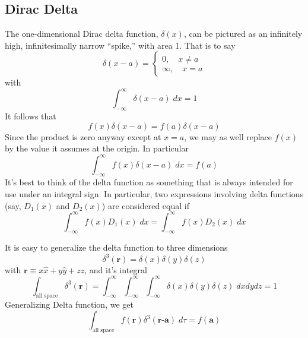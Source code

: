 \documentclass[../../../main.tex]{subfiles}
\begin{document}
\subsection{Dirac Delta}
The one-dimensional Dirac delta function, $\delta(x)$, can be pictured as an infinitely high, infinitesimally narrow “spike,” with area 1. That is to say
\begin{equation*}
    \delta (x-a)=\begin{cases}
        0,\quad  x\neq a \\
        \infty,\quad  x=a
    \end{cases}
\end{equation*}
with
\begin{equation*}
    \int_{-\infty}^{\infty} \delta (x-a)\;dx =1
\end{equation*}
It follows that
\begin{equation*}
    f(x)\delta(x-a)=f(a)\delta(x-a)
\end{equation*}
Since the product is zero anyway except at $x = a$, we may as well replace $f (x)$ by the value it assumes at the origin. In particular
\begin{equation*}
    \int_{-\infty}^{\infty}f(x)\delta(x-a)\;dx=f(a)
\end{equation*}
It's best to think of the delta function as something that is always intended for use under an integral sign. In particular, two expressions involving delta functions (say, $D_1(x)$ and $D_2(x)$) are considered equal if
\begin{equation*}
    \int_{-\infty}^{\infty}f(x)D_1(x)\;dx=\int_{-\infty}^{\infty}f(x)D_2(x)\;dx
\end{equation*}

It is easy to generalize the delta function to three dimensions
\begin{equation*}
    \delta^3(\textbf{r})=\delta (x)\delta (y)\delta(z)
\end{equation*}
with $\textbf{r} \equiv x \hat{x} + y\hat{y}+ z \hat{z}$, and it's integral
\begin{equation*}
    \int_{\text{all space}}\delta^3({\textbf{r}})=\int_{-\infty}^{\infty}\int_{-\infty}^{\infty}\int_{-\infty}^{\infty}\delta(x)\delta(y)\delta(z)\;dxdydz=1
\end{equation*}
Generalizing Delta function, we get
\begin{equation*}
    \int_{\text{all space}}f(\textbf{r})\delta^3({\textbf{r-a}})\;d\tau=f(\textbf{a})
\end{equation*}
\end{document}

